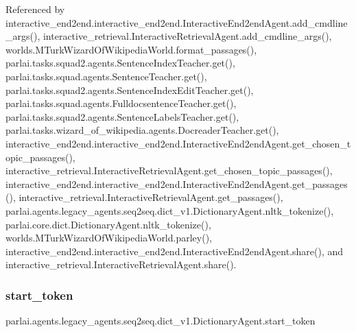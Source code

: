 Referenced by interactive\+\_\+end2end.\+interactive\+\_\+end2end.\+Interactive\+End2end\+Agent.\+add\+\_\+cmdline\+\_\+args(), interactive\+\_\+retrieval.\+Interactive\+Retrieval\+Agent.\+add\+\_\+cmdline\+\_\+args(), worlds.\+M\+Turk\+Wizard\+Of\+Wikipedia\+World.\+format\+\_\+passages(), parlai.\+tasks.\+squad2.\+agents.\+Sentence\+Index\+Teacher.\+get(), parlai.\+tasks.\+squad.\+agents.\+Sentence\+Teacher.\+get(), parlai.\+tasks.\+squad2.\+agents.\+Sentence\+Index\+Edit\+Teacher.\+get(), parlai.\+tasks.\+squad.\+agents.\+Fulldocsentence\+Teacher.\+get(), parlai.\+tasks.\+squad2.\+agents.\+Sentence\+Labels\+Teacher.\+get(), parlai.\+tasks.\+wizard\+\_\+of\+\_\+wikipedia.\+agents.\+Docreader\+Teacher.\+get(), interactive\+\_\+end2end.\+interactive\+\_\+end2end.\+Interactive\+End2end\+Agent.\+get\+\_\+chosen\+\_\+topic\+\_\+passages(), interactive\+\_\+retrieval.\+Interactive\+Retrieval\+Agent.\+get\+\_\+chosen\+\_\+topic\+\_\+passages(), interactive\+\_\+end2end.\+interactive\+\_\+end2end.\+Interactive\+End2end\+Agent.\+get\+\_\+passages(), interactive\+\_\+retrieval.\+Interactive\+Retrieval\+Agent.\+get\+\_\+passages(), parlai.\+agents.\+legacy\+\_\+agents.\+seq2seq.\+dict\+\_\+v1.\+Dictionary\+Agent.\+nltk\+\_\+tokenize(), parlai.\+core.\+dict.\+Dictionary\+Agent.\+nltk\+\_\+tokenize(), worlds.\+M\+Turk\+Wizard\+Of\+Wikipedia\+World.\+parley(), interactive\+\_\+end2end.\+interactive\+\_\+end2end.\+Interactive\+End2end\+Agent.\+share(), and interactive\+\_\+retrieval.\+Interactive\+Retrieval\+Agent.\+share().

\mbox{\label{classparlai_1_1agents_1_1legacy__agents_1_1seq2seq_1_1dict__v1_1_1DictionaryAgent_ac487aa9bb864761af57b67e9931f8596}} 
\subsubsection{\texorpdfstring{start\+\_\+token}{start\_token}}
{\footnotesize\ttfamily parlai.\+agents.\+legacy\+\_\+agents.\+seq2seq.\+dict\+\_\+v1.\+Dictionary\+Agent.\+start\+\_\+token}



